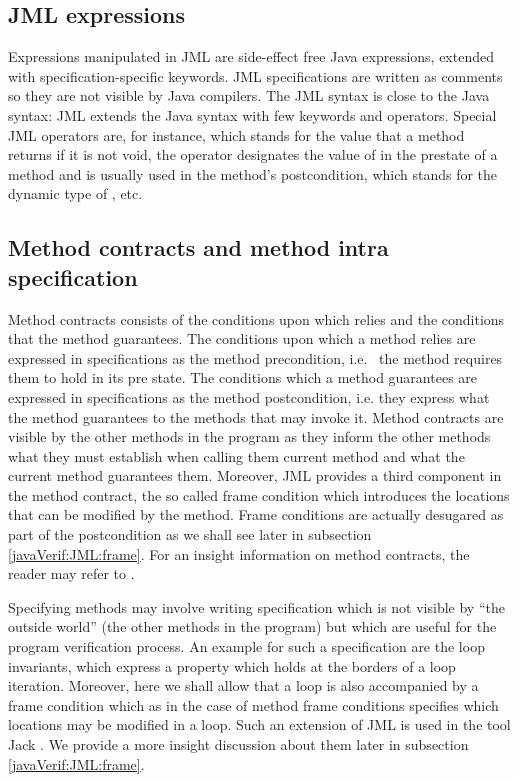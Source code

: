 \subsection{JML expressions}\label{javaVerif:JML:expression}   
    Expressions manipulated in JML  
    are side-effect free Java expressions, extended with
    specification-specific keywords. JML specifications are written as comments so they are not
    visible by Java compilers. The JML syntax is close to the Java syntax: JML extends the Java
    syntax with few keywords and operators. 
    Special JML operators are, for instance,  which stands for the value that a method returns if it is not
    void, the  operator 
    designates the value of  in the prestate of a method and is usually
    used in the method's postcondition,  which stands for the dynamic type of  , etc.


\subsection{Method contracts and method intra specification}\label{javaVerif:JML:methodContracts}  
Method contracts consists of the conditions upon which relies  and the conditions that the method guarantees.
The conditions upon which a method relies are expressed in specifications as the method precondition, i.e. \ the method requires them to hold 
in its pre state. The conditions which a method guarantees are expressed in specifications as the method postcondition, i.e. 
 they express what the method guarantees to the methods that may invoke it. Method contracts 
 are visible by the other methods in the program as they inform the other methods what they must establish when calling them current  method
and what the current method guarantees them. Moreover, JML provides a third component in the method contract, the so called frame condition which 
introduces the locations that can be modified by the method. Frame conditions are actually desugared as part of the postcondition as we shall see later in subsection 
\ref{javaVerif:JML:frame}. For an insight information on method contracts, the reader may refer to \cite{M97oos}.

Specifying methods may involve writing specification which is not visible by ``the outside world'' (the other methods in the program) but which are useful 
for the program verification process. An example for such a specification are the loop invariants, which express a property which holds at the borders of a loop iteration.
Moreover, here we shall allow that a loop is also accompanied by a frame condition which as in the case of method frame conditions
 specifies which locations may be modified in a loop. Such an extension of JML is used in the tool Jack \cite{BRL-JACK}. We provide a more 
insight discussion about them later in subsection \ref{javaVerif:JML:frame}. 

